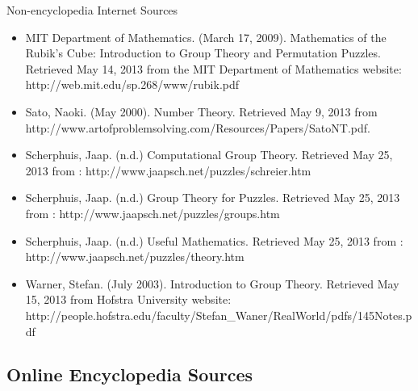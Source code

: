 \documentclass{beamer}
\begin{document}
\begin{frame}[allowframebreaks]{Non-encyclopedia Internet Sources}
\begin{itemize}
				\item MIT Department of Mathematics. (March 17, 2009). Mathematics of the Rubik’s Cube: Introduction to Group Theory and Permutation Puzzles. Retrieved May 14, 2013 from the MIT Department of Mathematics website: http://web.mit.edu/sp.268/www/rubik.pdf
				\item Sato, Naoki. (May 2000). Number Theory. Retrieved May 9, 2013 from http://www.artofproblemsolving.com/Resources/Papers/SatoNT.pdf.
				\item Scherphuis, Jaap. (n.d.) Computational Group Theory. Retrieved May 25, 2013 from : http://www.jaapsch.net/puzzles/schreier.htm
				\item Scherphuis, Jaap. (n.d.) Group Theory for Puzzles. Retrieved May 25, 2013 from : http://www.jaapsch.net/puzzles/groups.htm
				\item Scherphuis, Jaap. (n.d.) Useful Mathematics. Retrieved May 25, 2013 from : http://www.jaapsch.net/puzzles/theory.htm
				\item Warner, Stefan. (July 2003). Introduction to Group Theory. Retrieved May 15, 2013 from Hofstra University website: http://people.hofstra.edu/faculty/Stefan\_Waner/RealWorld/pdfs/145Notes.pdf
				\end{itemize}
				\end{frame}

			\subsection{Online Encyclopedia Sources}
\end{document}
